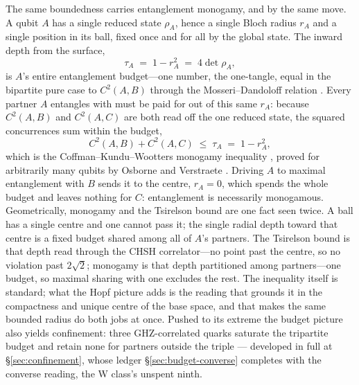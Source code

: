 \noindent
\label{sec:monogamy}
The same boundedness carries entanglement monogamy, and by the same
move. A qubit $A$ has a single reduced state $\rho_{A}$, hence a single Bloch
radius $r_{A}$ and a single position in its ball, fixed once and for all by the
global state. The inward depth from the surface,
\begin{equation}
  \tau_{A} \;=\; 1 - r_{A}^{2} \;=\; 4\det\rho_{A},
\end{equation}
is $A$'s entire entanglement budget---one number, the one-tangle, equal in the
bipartite pure case to $C^{2}(A,B)$ through the Mosseri--Dandoloff relation
\autocite{mosseri2001hopf}. Every partner $A$ entangles with must be paid
for out of this same $r_{A}$: because $C^{2}(A,B)$ and $C^{2}(A,C)$ are both read
off the one reduced state, the squared concurrences sum within the budget,
\begin{equation}
  C^{2}(A,B) + C^{2}(A,C) \;\le\; \tau_{A} \;=\; 1 - r_{A}^{2},
\end{equation}
which is the Coffman--Kundu--Wootters monogamy inequality
\autocite{coffmankunduwootters2000}, proved for arbitrarily many qubits by Osborne and
Verstraete \autocite{osborneverstraete2006}. Driving $A$ to maximal entanglement with $B$
sends it to the centre, $r_{A}=0$, which spends the whole budget and leaves
nothing for $C$: entanglement is necessarily monogamous. Geometrically, monogamy
and the Tsirelson bound are one fact seen twice. A ball has a single centre and
one cannot pass it; the single radial depth toward that centre is a fixed budget
shared among all of $A$'s partners. The Tsirelson bound is that depth read
through the CHSH correlator---no point past the centre, so no violation past
$2\sqrt{2}$; monogamy is that depth partitioned among partners---one budget, so
maximal sharing with one excludes the rest. The inequality itself is standard;
what the Hopf picture adds is the reading that grounds it in the compactness and
unique centre of the base space, and that makes the same bounded radius do both
jobs at once. Pushed to its extreme the budget picture also yields confinement:
three GHZ-correlated quarks saturate the tripartite budget and retain none for partners outside
the triple --- developed in full at \S\ref{sec:confinement}, whose ledger
\S\ref{sec:budget-converse} completes with the converse reading, the W class's unspent ninth.
